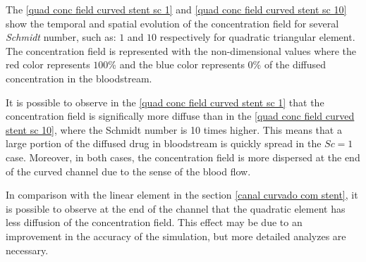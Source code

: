 \vspace{1cm}
The \ref{quad conc field curved stent sc 1} and
\ref{quad conc field curved stent sc 10} show the 
temporal and spatial evolution 
of the concentration field for several \textit{Schmidt} number, 
such as: $1$ and $10$ respectively for quadratic triangular element. 
The concentration field is 
represented with the non-dimensional values where the red color 
represents $100$\% and the blue color represents $0$\% 
of the diffused concentration in the bloodstream. 

\bigskip
It is possible to observe in the \ref{quad conc field curved stent sc 1}
that the concentration field is significally more diffuse than in the
\ref{quad conc field curved stent sc 10}, where the Schmidt number
is 10 times higher. This means that a large portion of the
diffused drug in bloodstream is quickly spread in the
$Sc=1$ case.
Moreover, in both cases, the concentration field
is more dispersed at the end of the curved channel due to
the sense of the blood flow. 

\bigskip

In comparison with the linear element in the section 
\ref{canal curvado com stent}, it is possible 
to observe at the end of the channel that the quadratic 
element has less diffusion of the concentration field. 
This effect may be due to an improvement in the accuracy 
of the simulation, but more detailed analyzes are necessary.


